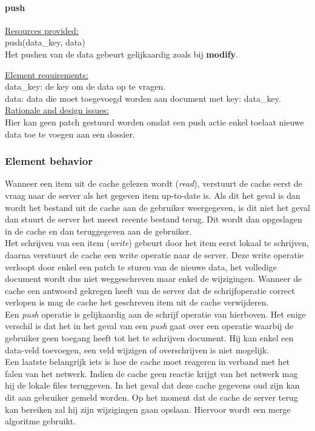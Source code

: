 \documentclass[a4paper,10pt]{article}
\begin{document}
\paragraph{push}
\underline{Resources provided:}\\
push(data\_key, data)\\
Het pushen van de data gebeurt gelijkaardig zoals bij \textbf{modify}.

\underline{Element requirements:}\\
data\_key: de key om de data op te vragen.\\
data: data die moet toegevoegd worden aan document met key: data\_key.\\

\underline{Rationale and design issues:}\\
Hier kan geen patch gestuurd worden omdat een push actie enkel toelaat nieuwe data toe te voegen aan een dossier.

\subsubsection{Element behavior}
Wanneer een item uit de cache gelezen wordt (\textit{read}), verstuurt de cache eerst de vraag naar de server als het gegeven item up-to-date is.  Als dit het geval is dan wordt het bestand uit de cache aan de gebruiker weergegeven, is dit niet het geval dan stuurt de server het meest recente bestand terug.  Dit wordt dan opgeslagen in de cache en dan teruggegeven aan de gebruiker.\\
Het schrijven van een item (\textit{write}) gebeurt door het item eerst lokaal te schrijven, daarna verstuurt de cache een write operatie naar de server.  Deze write operatie verloopt door enkel een patch te sturen van de nieuwe data, het volledige document wordt dus niet weggeschreven maar enkel de wijzigingen.  Wanneer de cache een antwoord gekregen heeft van de server dat de schrijfoperatie correct verlopen is mag de cache het geschreven item uit de cache verwijderen.\\
Een \textit{push} operatie is gelijkaardig aan de schrijf operatie van hierboven.  Het enige verschil is dat het in het geval van een \textit{push} gaat over een operatie waarbij de gebruiker geen toegang heeft tot het te schrijven document.  Hij kan enkel een data-veld toevoegen, een veld wijzigen of overschrijven is niet mogelijk.\\
Een laatste belangrijk iets is hoe de cache moet reageren in verband met het falen van het netwerk.  Indien de cache geen reactie krijgt van het netwerk mag hij de lokale files teruggeven.  In het geval dat deze cache gegevens oud zijn kan dit aan gebruiker gemeld worden.  Op het moment dat de cache de server terug kan bereiken zal hij zijn wijzigingen gaan opslaan.  Hiervoor wordt een merge algoritme gebruikt.
\end{document}
